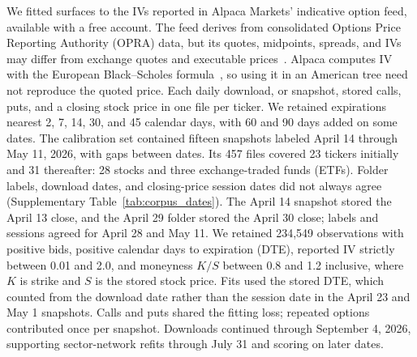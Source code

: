 We fitted surfaces to the IVs reported in Alpaca Markets' indicative option feed, available with a free account. The feed derives from consolidated Options Price Reporting Authority (OPRA) data, but its quotes, midpoints, spreads, and IVs may differ from exchange quotes and executable prices~\cite{alpaca_option_feed}. Alpaca computes IV with the European Black--Scholes formula~\cite{alpaca_market_data_faq}, so using it in an American tree need not reproduce the quoted price. Each daily download, or snapshot, stored calls, puts, and a closing stock price in one file per ticker. We retained expirations nearest 2, 7, 14, 30, and 45 calendar days, with 60 and 90 days added on some dates. The calibration set contained fifteen snapshots labeled April 14 through May 11, 2026, with gaps between dates. Its 457 files covered 23 tickers initially and 31 thereafter: 28 stocks and three exchange-traded funds (ETFs). Folder labels, download dates, and closing-price session dates did not always agree (Supplementary Table~\ref{tab:corpus_dates}). The April 14 snapshot stored the April 13 close, and the April 29 folder stored the April 30 close; labels and sessions agreed for April 28 and May 11. We retained 234{,}549 observations with positive bids, positive calendar days to expiration (DTE), reported IV strictly between 0.01 and 2.0, and moneyness $K/S$ between 0.8 and 1.2 inclusive, where $K$ is strike and $S$ is the stored stock price. Fits used the stored DTE, which counted from the download date rather than the session date in the April 23 and May 1 snapshots. Calls and puts shared the fitting loss; repeated options contributed once per snapshot. Downloads continued through September 4, 2026, supporting sector-network refits through July 31 and scoring on later dates.

